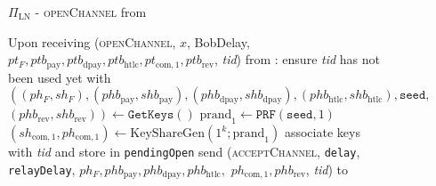 \begin{figure}[!htbp]
  \begin{protocolbox}{$\Pi_{\mathrm{LN}}$ - \textsc{openChannel} from \bob}
    \begin{algorithmic}[1]
      \State Upon receiving (\textsc{openChannel}, $x$, BobDelay, $pt_F,
      ptb_{\mathrm{pay}}, ptb_{\mathrm{dpay}}, ptb_{\mathrm{htlc}},
      pt_{\mathrm{com}, 1}, ptb_{\mathrm{rev}}$, \textit{tid}) from \bob:
      \Indent
        \State ensure \textit{tid} has not been used yet with \bob
        \State $\left(\left(ph_F, sh_F\right), \left(phb_{\mathrm{pay}},
        shb_{\mathrm{pay}}\right), \left(phb_{\mathrm{dpay}},
        shb_{\mathrm{dpay}}\right), \left(phb_{\mathrm{htlc}},
        shb_{\mathrm{htlc}}\right), \mathtt{seed},\right.$
        $\left.\left(phb_{\mathrm{rev}}, shb_{\mathrm{rev}}\right)\right) \gets
        \texttt{GetKeys}\left(\right)$
        \State $\mathrm{prand}_1 \gets \texttt{PRF}\left(\mathtt{seed},
        1\right)$
        \State $\left(sh_{\mathrm{com}, 1}, ph_{\mathrm{com}, 1}\right) \gets
        \mathrm{KeyShareGen}\left(1^k; \mathrm{prand}_1\right)$
        \State associate keys with \textit{tid} and store in
        \texttt{pendingOpen}
        \State send (\textsc{acceptChannel}, \texttt{delay},
        \texttt{relayDelay}, $ph_F, phb_{\mathrm{pay}}, phb_{\mathrm{dpay}},
        phb_{\mathrm{htlc}},$ $ph_{\mathrm{com}, 1}, phb_{\mathrm{rev}}$,
        \textit{tid}) to \bob{}
      \EndIndent
    \end{algorithmic}
  \end{protocolbox}
  \caption{}
  \label{alg:protocol:open:openChannel}
\end{figure}

